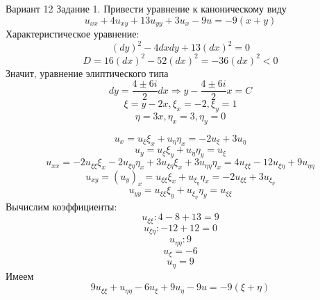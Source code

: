 \documentclass[12pt]{article}
\begin{document}
Вариант 12
\newline
Задание 1. Привести уравнение к каноническому виду
$$u_{xx} + 4u_{xy} + 13u_{yy} + 3u_x - 9u = -9(x+y)$$
Характеристическое уравнение:
$$(dy)^2 - 4dxdy + 13(dx)^2 = 0$$
$$D = 16(dx)^2 - 52(dx)^2 = -36(dx)^2 < 0$$
Значит, уравнение элиптического типа
$$dy = \frac{4 \pm 6i}{2}dx \Rightarrow y - \frac{4 \pm 6i}{2}x = C$$
$$\xi = y - 2x, \xi_x = -2, \xi_y = 1$$
$$\eta = 3x, \eta_x = 3, \eta_y = 0$$

$$u_x = u_{\xi}\xi_x + u_{\eta}\eta_x = -2u_{\xi} + 3u_{\eta}$$
$$u_y = u_{\xi}\xi_y + u_{\eta}\eta_y = u_{\xi}$$
$$u_{xx} = -2u_{\xi\xi}\xi_x - 2u_{\xi\eta}\eta_x + 3u_{\xi\eta}\xi_x + 3u_{\eta\eta}\eta_x 
= 4u_{\xi\xi} - 12u_{\xi\eta}+9u_{\eta\eta}$$
$$u_{xy} = (u_y)_x = u_{\xi\xi}\xi_x + u_{\xi_\eta}\eta_x
= -2u_{\xi\xi} + 3u_{\xi_\eta}$$
$$u_{yy} = u_{\xi\xi}\xi_y + u_{\xi_\eta}\eta_y 
= u_{\xi\xi}$$
Вычислим коэффициенты:
$$u_{\xi\xi}: 4 - 8 + 13 = 9$$
$$u_{\xi\eta}: -12 + 12 = 0$$
$$u_{\eta\eta}: 9$$
$$u_{\xi} = -6$$
$$u_{\eta} = 9$$
Имеем
$$9u_{\xi\xi} + u_{\eta\eta} - 6u_{\xi} +9u_{\eta} - 9u = -9(\xi+\eta)$$
\end{document}
